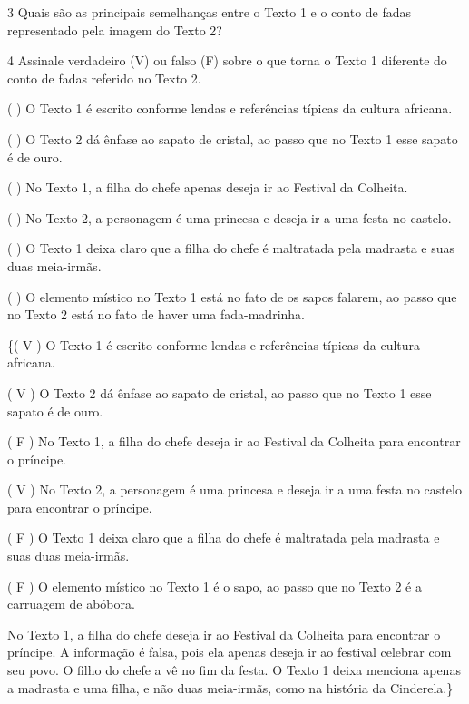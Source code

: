 {\num{3} Quais são as principais semelhanças entre o Texto 1 e o conto de
fadas representado pela imagem do Texto 2?


\num{4} Assinale verdadeiro (V) ou falso (F) sobre o que torna o Texto 1
diferente do conto de fadas referido no Texto 2.

( ) O Texto 1 é escrito conforme lendas e referências típicas da cultura
africana.

( ) O Texto 2 dá ênfase ao sapato de cristal, ao passo que no Texto 1
esse sapato é de ouro.

( ) No Texto 1, a filha do chefe apenas deseja ir ao Festival da
Colheita.

( ) No Texto 2, a personagem é uma princesa e deseja ir a uma festa no
castelo.

( ) O Texto 1 deixa claro que a filha do chefe é maltratada pela
madrasta e suas duas meia-irmãs.

( ) O elemento místico no Texto 1 está no fato de os sapos falarem, ao
passo que no Texto 2 está no fato de haver uma fada-madrinha.

\coment

\{( V ) O Texto 1 é escrito conforme lendas e referências típicas da
cultura africana.

( V ) O Texto 2 dá ênfase ao sapato de cristal, ao passo que no Texto 1
esse sapato é de ouro.

( F ) No Texto 1, a filha do chefe deseja ir ao Festival da Colheita
para encontrar o príncipe.

( V ) No Texto 2, a personagem é uma princesa e deseja ir a uma festa no
castelo para encontrar o príncipe.

( F ) O Texto 1 deixa claro que a filha do chefe é maltratada pela
madrasta e suas duas meia-irmãs.

( F ) O elemento místico no Texto 1 é o sapo, ao passo que no Texto 2 é
a carruagem de abóbora.

No Texto 1, a filha do chefe deseja ir ao Festival da Colheita para
encontrar o príncipe. A informação é falsa, pois ela apenas deseja ir ao
festival celebrar com seu povo. O filho do chefe a vê no fim da festa. O
Texto 1 deixa menciona apenas a madrasta e uma filha, e não duas
meia-irmãs, como na história da Cinderela.\}

}

